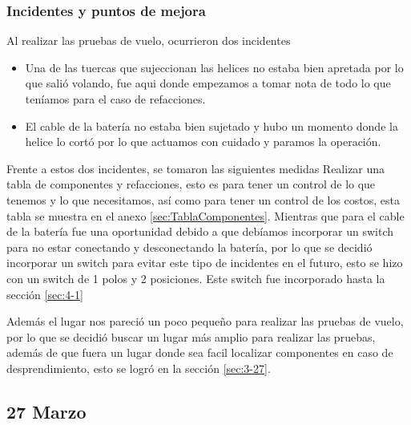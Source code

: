 \documentclass[pdflatex,sn-mathphys-num]{sn-jnl}%
\begin{document}
\subsubsection{Incidentes y puntos de mejora}
Al realizar las pruebas de vuelo, ocurrieron dos incidentes
\begin{itemize}
    \item Una de las tuercas que sujeccionan las helices no estaba bien apretada por lo que salió volando, fue aqui donde empezamos a tomar nota de todo lo que teníamos para el caso de refacciones.
    \item El cable de la batería no estaba bien sujetado y hubo un momento donde la helice lo cortó por lo que actuamos con cuidado y paramos la operación.
\end{itemize}
Frente a estos dos incidentes, se tomaron las siguientes medidas
Realizar una tabla de componentes y refacciones, esto es para tener un control de lo que tenemos y lo que necesitamos, así como para tener un control de los costos, esta tabla se muestra en el anexo \ref{sec:TablaComponentes}.
Mientras que para el cable de la batería fue una oportunidad debido a que debíamos incorporar un switch para no estar conectando y desconectando la batería, por lo que se decidió incorporar un switch para evitar este tipo de incidentes en el futuro, esto se hizo con un switch de 1 polos y 2 posiciones. Este switch fue incorporado hasta la sección \ref{sec:4-1}

Además el lugar nos pareció un poco pequeño para realizar las pruebas de vuelo, por lo que se decidió buscar un lugar más amplio para realizar las pruebas, además de que fuera un lugar donde sea facil localizar componentes en caso de desprendimiento, esto se logró en la sección \ref{sec:3-27}.

\subsection{27 Marzo \label{sec:3-27}}
\end{document}
